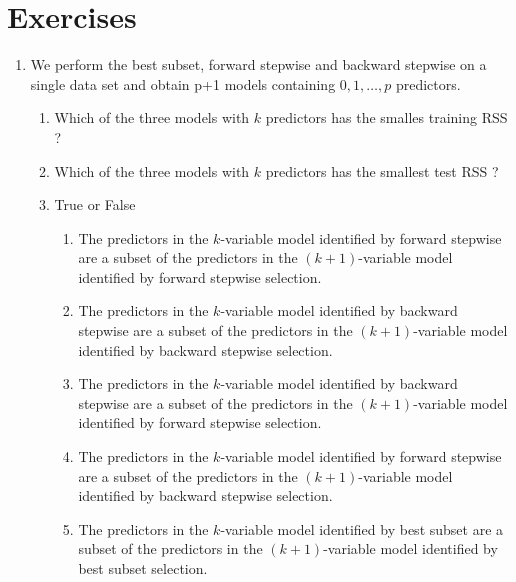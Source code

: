 \documentclass[../statistical_learning_notes.tex]{subfiles}
\begin{document}
    \section{Exercises}
    \begin{enumerate}
        \item We perform the best subset, forward stepwise and backward stepwise on a single data set and obtain p+1 models containing $0, 1, \ldots, p$ predictors.
        \begin{enumerate}
            \item Which of the three models with $k$ predictors has the smalles training RSS ?
            \item Which of the three models with $k$ predictors has the smallest test RSS ?
            \item True or False
            \begin{enumerate}
                \item The predictors in the $k$-variable model identified by forward stepwise are a subset of the predictors in the $(k+1)$-variable model identified by forward stepwise selection.
                \item The predictors in the $k$-variable model identified by backward stepwise are a subset of the predictors in the $(k+1)$-variable model identified by backward stepwise selection.
                \item The predictors in the $k$-variable model identified by backward stepwise are a subset of the predictors in the $(k + 1)$-variable model identified by forward stepwise selection.
                \item The predictors in the $k$-variable model identified by forward stepwise are a subset of the predictors in the $(k+1)$-variable model identified by backward stepwise selection.
                \item The predictors in the $k$-variable model identified by best subset are a subset of the predictors in the $(k + 1)$-variable model identified by best subset selection.
            \end{enumerate}
        \end{enumerate}


\end{enumerate}
\end{document}
